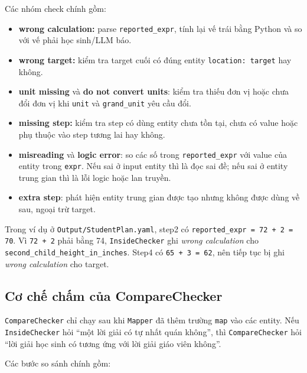 \documentclass[12pt,a4paper]{article}
\begin{document}
Các nhóm check chính gồm:

\begin{itemize}[leftmargin=*]
    \item \textbf{wrong calculation:} parse \texttt{reported\_expr}, tính lại
    vế trái bằng Python và so với vế phải học sinh/LLM báo.
    \item \textbf{wrong target:} kiểm tra target cuối có đúng entity
    \texttt{location: target} hay không.
    \item \textbf{unit missing} và \textbf{do not convert units}: kiểm tra thiếu
    đơn vị hoặc chưa đổi đơn vị khi \texttt{unit} và \texttt{grand\_unit} yêu
    cầu đổi.
    \item \textbf{missing step:} kiểm tra step có dùng entity chưa tồn tại, chưa
    có value hoặc phụ thuộc vào step tương lai hay không.
    \item \textbf{misreading} và \textbf{logic error}: so các số trong
    \texttt{reported\_expr} với value của entity trong \texttt{expr}. Nếu sai ở
    input entity thì là đọc sai đề; nếu sai ở entity trung gian thì là lỗi logic
    hoặc lan truyền.
    \item \textbf{extra step}: phát hiện entity trung gian được tạo nhưng không
    được dùng về sau, ngoại trừ target.
\end{itemize}

Trong ví dụ ở \texttt{Output/StudentPlan.yaml}, step2 có
\texttt{reported\_expr = 72 + 2 = 70}. Vì \texttt{72 + 2} phải bằng 74,
\texttt{InsideChecker} ghi \textit{wrong calculation} cho
\texttt{second\_child\_height\_in\_inches}. Step4 có
\texttt{65 + 3 = 62}, nên tiếp tục bị ghi \textit{wrong calculation} cho target.

\subsection{Cơ chế chấm của CompareChecker}

\texttt{CompareChecker} chỉ chạy sau khi \texttt{Mapper} đã thêm trường
\texttt{map} vào các entity. Nếu \texttt{InsideChecker} hỏi ``một lời giải có
tự nhất quán không'', thì \texttt{CompareChecker} hỏi ``lời giải học sinh có
tương ứng với lời giải giáo viên không''.

Các bước so sánh chính gồm:
\end{document}
